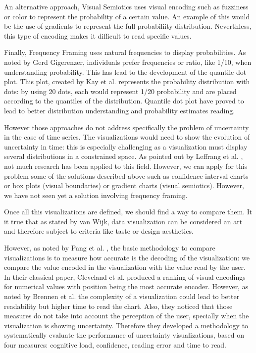 \documentclass[a4paper,3p,sort&compress]{elsarticle}
\begin{document}
An alternative approach, Visual Semiotics uses visual encoding such as fuzziness or color to represent 
the probability of a certain value. An example of this would be the use of gradients to represent the 
full probabiliity distribution. Neverthless, this type of encoding makes it difficult to read specific 
values. 

Finally, Frequency Framing uses natural frequencies to display probabilities. As noted by Gerd 
Gigerenzer, individuals prefer frequencies or ratio, like 1/10, when understanding probability. This has 
lead to the development of the quantile dot plot. This plot, created by Kay et al. \cite{2016-when-ish-is-my-bus}
\cite{2016-when-ish-is-my-bus} 
represents 
the probability distribution with dots: by using 20 dots, each would represent 1/20 probability 
and are placed according 
to the quantiles of the distribution. Quantile dot plot have proved to lead to better distribution 
understanding and probability estimates reading. 

However those approaches do not address specifically the problem of uncertainty in the case of time series.
The visualizations would need to show the evolution of uncertainty in time: this 
is especially challenging as a visualization must display several distributions in a constrained space.  
As pointed out by Leffrang et al. \cite{leffrang_should_2021}, not much research has been applied to this 
field. 
However, we can apply for this problem some of the solutions described above such as confidence interval charts or 
box plots (visual boundaries) or gradient charts (visual semiotics). However, we have not seen yet a solution involving 
frequency framing. 

Once all this visualizations are defined, we should find a way to compare them. It it true that as stated by van Wijk,
data visualization can be considered an art and therefore subject to criteria like taste or design aesthetics.

However, as noted by Pang et al. \cite{pang_approaches_1997}, the basic methodology to compare visualizations is to measure how accurate is the 
decoding of the visualization: we compare the value encoded in the visualization with the value read
by the user. In their classical paper, Cleveland et al. \cite{cleveland_graphical_1984} produced a ranking of visual encodings for numerical values 
with position being the most accurate encoder. However, as noted by Brennen et al. \cite{brennen_instrument_2018}
the complexity of a visualization could lead to better readability but higher time to read the chart. Also, 
they noticed that those measures do not take into account the perception of the user, specially when the visualization
is showing uncertainty. Therefore they developed a methodology 
to systematically evaluate the performance of uncertainty visualizations, based on four measures: 
cognitive load, confidence, reading error and time to read. 
\end{document}
